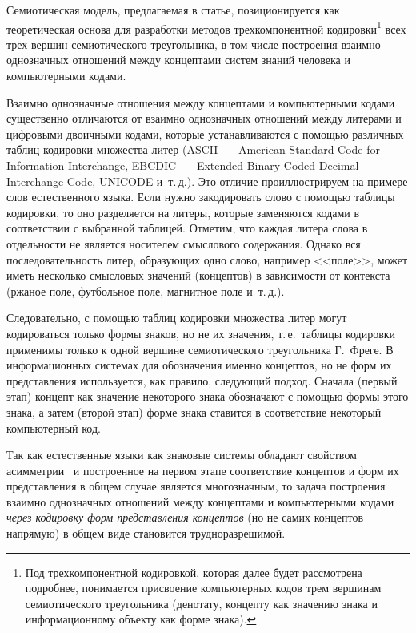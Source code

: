 \begin{multicols}{2}
Семиотическая модель, предлагаемая в статье, позиционируется как теоретическая 
основа для разработки методов трехкомпонентной кодировки\footnote{Под трехкомпонентной 
кодировкой, которая далее будет рассмотрена подробнее, понимается присвоение компьютерных кодов трем 
вершинам семиотического треугольника (денотату, концепту как значению знака и информационному 
объекту как форме знака).} всех трех вершин семиотического треугольника, в том числе 
построения взаимно однозначных отношений между концептами систем знаний человека и 
компьютерными кодами.
   
Взаимно однозначные отношения между концептами и компьютерными кодами 
существенно отличаются от взаимно однозначных отношений между литерами и цифровыми 
двоичными кодами, которые устанавливаются с помощью различных таблиц кодировки 
множества литер (ASCII~--- American Standard Code for
Information Interchange, EBCDIC~--- Extended Binary Coded Decimal
Interchange Code, UNICODE и~т.\,д.). Это отличие проиллюстрируем на 
примере слов естественного языка. Если нужно закодировать слово с помощью таблицы 
кодировки, то оно разделяется на литеры, которые заменяются кодами в соответствии с 
выбранной таблицей. Отметим, что каждая литера слова в отдельности не является 
носителем смыслового содержания. Однако вся последовательность литер, образующих одно 
слово, например <<поле>>, может иметь несколько смысловых значений (концептов) в 
зависимости от контекста (ржаное поле, футбольное поле, магнитное поле и~т.\,д.).
   
   Следовательно, с помощью таблиц кодировки множества литер могут кодироваться 
только формы знаков, но не их значения, т.\,е.\ таблицы кодировки применимы только к 
одной вершине семиотического треугольника Г.~Фреге. В информационных системах для 
обозначения именно концептов, но не форм их представления используется, как правило, 
следующий подход. Сначала (первый этап) концепт как значение некоторого знака 
обозначают с помощью формы этого знака, а затем (второй этап) форме знака ставится в 
соответствие некоторый компьютерный код.
   
   Так как естественные языки как знаковые сис\-те\-мы обладают свойством 
асимметрии~\cite{23zat} и построенное на первом этапе соответствие концептов и форм 
их представления в общем случае является многозначным, то задача построения взаимно 
однозначных отношений между концептами и компьютерными кодами \textit{через 
кодировку форм пред\-став\-ле\-ния концептов} (но не самих концептов напрямую) в общем виде 
становится трудноразрешимой.
   

\end{multicols}
